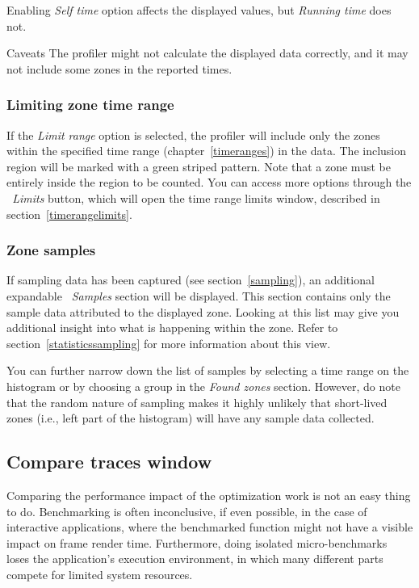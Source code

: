\documentclass[hidelinks,titlepage,a4paper,twoside]{article}
\begin{document}
Enabling \emph{Self time} option affects the displayed values, but \emph{Running time} does not.

\begin{bclogo}[
noborder=true,
couleur=black!5,
logo=\bcattention
]{Caveats}
The profiler might not calculate the displayed data correctly, and it may not include some zones in the reported times.
\end{bclogo}

\subsubsection{Limiting zone time range}

If the \emph{Limit range} option is selected, the profiler will include only the zones within the specified time range (chapter~\ref{timeranges}) in the data. The inclusion region will be marked with a green striped pattern. Note that a zone must be entirely inside the region to be counted. You can access more options through the \emph{\faRuler{}~Limits} button, which will open the time range limits window, described in section~\ref{timerangelimits}.

\subsubsection{Zone samples}

If sampling data has been captured (see section~\ref{sampling}), an additional expandable \emph{\faEyeDropper{}~Samples} section will be displayed. This section contains only the sample data attributed to the displayed zone. Looking at this list may give you additional insight into what is happening within the zone. Refer to section~\ref{statisticssampling} for more information about this view.

You can further narrow down the list of samples by selecting a time range on the histogram or by choosing a group in the \emph{Found zones} section. However, do note that the random nature of sampling makes it highly unlikely that short-lived zones (i.e., left part of the histogram) will have any sample data collected.

\subsection{Compare traces window}
\label{compare}

Comparing the performance impact of the optimization work is not an easy thing to do. Benchmarking is often inconclusive, if even possible, in the case of interactive applications, where the benchmarked function might not have a visible impact on frame render time. Furthermore, doing isolated micro-benchmarks loses the application's execution environment, in which many different parts compete for limited system resources.
\end{document}
